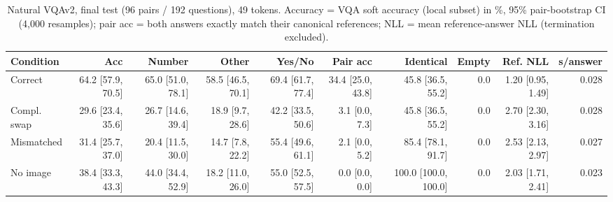 \begin{table}[t]
\centering
\small
\caption{Natural VQAv2, final test (96 pairs / 192 questions), 49 tokens. Accuracy = VQA soft accuracy (local subset) in \%, 95\% pair-bootstrap CI (4,000 resamples); pair acc = both answers exactly match their canonical references; NLL = mean reference-answer NLL (termination excluded).}
\label{tab:t2_t2_final_vqa_compress49}
\begin{tabular}{lrrrrrrrrr}
\toprule
Condition & Acc & Number & Other & Yes/No & Pair acc & Identical & Empty & Ref. NLL & s/answer \\
\midrule
Correct & 64.2 [57.9, 70.5] & 65.0 [51.0, 78.1] & 58.5 [46.5, 70.1] & 69.4 [61.7, 77.4] & 34.4 [25.0, 43.8] & 45.8 [36.5, 55.2] & 0.0 & 1.20 [0.95, 1.49] & 0.028 \\
Compl. swap & 29.6 [23.4, 35.6] & 26.7 [14.6, 39.4] & 18.9 [9.7, 28.6] & 42.2 [33.5, 50.6] & 3.1 [0.0, 7.3] & 45.8 [36.5, 55.2] & 0.0 & 2.70 [2.30, 3.16] & 0.028 \\
Mismatched & 31.4 [25.7, 37.0] & 20.4 [11.5, 30.0] & 14.7 [7.8, 22.2] & 55.4 [49.6, 61.1] & 2.1 [0.0, 5.2] & 85.4 [78.1, 91.7] & 0.0 & 2.53 [2.13, 2.97] & 0.027 \\
No image & 38.4 [33.3, 43.3] & 44.0 [34.4, 52.9] & 18.2 [11.0, 26.0] & 55.0 [52.5, 57.5] & 0.0 [0.0, 0.0] & 100.0 [100.0, 100.0] & 0.0 & 2.03 [1.71, 2.41] & 0.023 \\
\bottomrule
\end{tabular}
\end{table}
